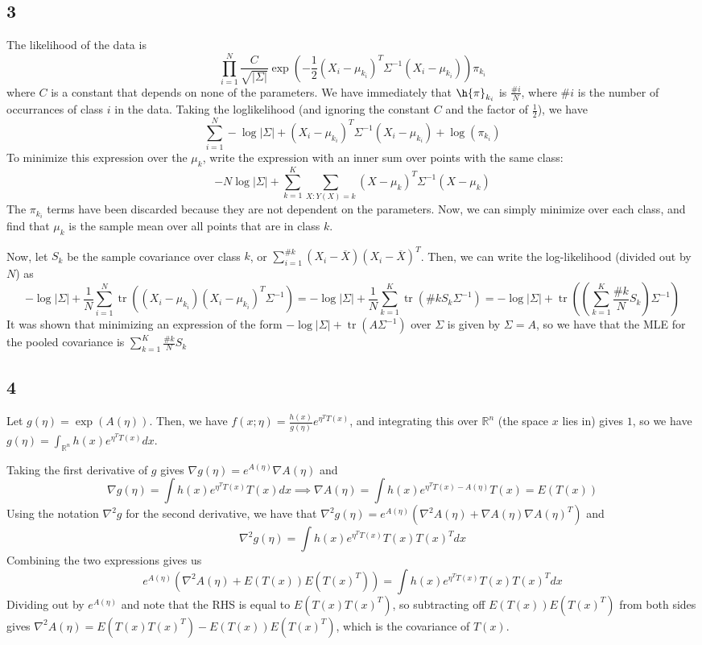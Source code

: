 \documentclass{article}
\newcommand{\conj}{\overline}
\DeclareMathOperator{\tr}{tr}
\newcommand{\rn}{\mathbb{R}}
\begin{document}
\subsection*{3}
The likelihood of the data is 
\[\prod_{i=1}^N\frac{C}{\sqrt{|\Sigma|}}\exp\left(-\frac{1}{2}(X_i-\mu_{k_i})^T\Sigma^{-1}(X_i-\mu_{k_i})\right)\pi_{k_i}\]
where $C$ is a constant that depends on none of the parameters. We have immediately that $\h{\pi}_{k_i}$ is $\frac{\#i}{N}$, where $\#i$ is the number of occurrances of class $i$ in the data. Taking the loglikelihood (and ignoring the constant $C$ and the factor of $\frac{1}{2}$), we have
\[\sum_{i=1}^N-\log|\Sigma|+(X_i-\mu_{k_i})^T\Sigma^{-1}(X_i-\mu_{k_i})+\log(\pi_{k_i})\]
To minimize this expression over the $\mu_k$, write the expression with an inner sum over points with the same class:
\[-N\log|\Sigma|+\sum_{k=1}^K\sum_{X:Y(X)=k}(X-\mu_k)^T\Sigma^{-1}(X-\mu_k)\]
The $\pi_{k_i}$ terms have been discarded because they are not dependent on the parameters. Now, we can simply minimize over each class, and find that $\mu_k$ is the sample mean over all points that are in class $k$. 

Now, let $S_k$ be the sample covariance over class $k$, or $\sum_{i=1}^{\#k}(X_i-\conj{X})(X_i-\conj{X})^T$. Then, we can write the log-likelihood (divided out by $N$) as
\[-\log|\Sigma|+\frac{1}{N}\sum_{i=1}^N\tr\left((X_i-\mu_{k_i})(X_i-\mu_{k_i})^T\Sigma^{-1}\right)=-\log|\Sigma|+\frac{1}{N}\sum_{k=1}^K\tr\left(\#kS_k\Sigma^{-1}\right)=-\log|\Sigma|+\tr\left(\left(\sum_{k=1}^K\frac{\#k}{N}S_k\right)\Sigma^{-1}\right)\]
It was shown that minimizing an expression of the form $-\log|\Sigma|+\tr(A\Sigma^{-1})$ over $\Sigma$ is given by $\Sigma=A$, so we have that the MLE for the pooled covariance is $\sum_{k=1}^K\frac{\#k}{N}S_k$
\subsection*{4}
Let $g(\eta)=\exp(A(\eta))$. Then, we have $f(x;\eta)=\frac{h(x)}{g(\eta)}e^{\eta^TT(x)}$, and integrating this over $\rn^n$ (the space $x$ lies in) gives $1$, so we have $g(\eta)=\int_{\rn^n}h(x)e^{\eta^TT(x)}dx$.

Taking the first derivative of $g$ gives $\nabla g(\eta)=e^{A(\eta)}\nabla A(\eta)$ and 
\[\nabla g(\eta)=\int h(x)e^{\eta^TT(x)}T(x)dx\implies\nabla A(\eta)=\int h(x)e^{\eta^TT(x)-A(\eta)}T(x)=E(T(x))\]
Using the notation $\nabla^2 g$ for the second derivative, we have that $\nabla^2g(\eta)=e^{A(\eta)}\left(\nabla^2A(\eta)+\nabla A(\eta)\nabla A(\eta)^T\right)$ and
\[\nabla^2 g(\eta)=\int h(x)e^{\eta^TT(x)}T(x)T(x)^Tdx\]
Combining the two expressions gives us 
\[e^{A(\eta)}\left(\nabla^2 A(\eta)+E(T(x))E(T(x)^T)\right)=\int h(x)e^{\eta^TT(x)}T(x)T(x)^Tdx\]
Dividing out by $e^{A(\eta)}$ and note that the RHS is equal to $E(T(x)T(x)^T)$, so subtracting off $E(T(x))E(T(x)^T)$ from both sides gives $\nabla^2A(\eta)=E(T(x)T(x)^T)-E(T(x))E(T(x)^T)$, which is the covariance of $T(x)$.
\end{document}
